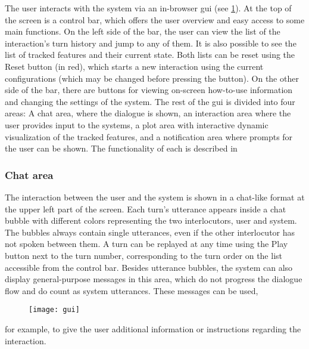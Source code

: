 The user interacts with the system via an in-browser \ac{gui} (see \cref{fig:gui}).
At the top of the screen is a control bar, which offers the user overview and easy access to some main functions.
On the left side of the bar, the user can view the list of the interaction's turn history and jump to any of them.
It is also possible to see the list of tracked features and their current state.
Both lists can be reset using the Reset button (in red), which starts a new interaction using the current configurations (which may be changed before pressing the button).
On the other side of the bar, there are buttons for viewing on-screen how-to-use information and changing the settings of the system.
The rest of the \ac{gui} is divided into four areas:
A chat area, where the dialogue is shown,
an interaction area where the user provides input to the systems,
a plot area with interactive dynamic visualization of the tracked features,
and a notification area where prompts for the user can be shown.
The functionality of each is described in 

\subsubsection{Chat area}
\label{subsubsec:chat_area}

The interaction between the user and the system is shown in a chat-like format at the upper left part of the screen.
Each turn's utterance appears inside a chat bubble with different colors representing the two interlocutors, user and system.
The bubbles always contain single utterances, even if the other interlocutor has not spoken between them.
A turn can be replayed at any time using the Play button next to the turn number, corresponding to the turn order on the list accessible from the control bar.
Besides utterance bubbles, the system can also display general-purpose messages in this area, which do not progress the dialogue flow and do count as system utterances.
These messages can be used,
%
\begin{landscape}
	\begin{figure}[t]
		\centering
		\vspace*{-2cm}
		\hspace*{-2cm}
		\texttt{[image: gui]}
		\caption[Web system in-browser \acs{gui}]
			{}
		\label{fig:gui}
	\end{figure}
\end{landscape}
\noindent
for example, to give the user additional information or instructions regarding the interaction.

